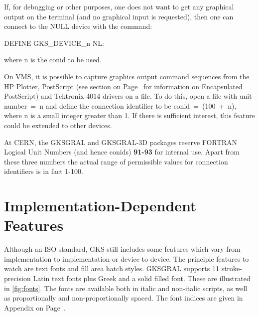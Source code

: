 If, for debugging or other purposes, one does not want to get any graphical
output on the terminal (and no graphical input is requested),
then one can connect to the NULL device with the command:
\begin{XMP}
DEFINE   GKS_DEVICE_n   NL:
\end{XMP}
where n is the conid to be used.
 
On VMS, it is possible to capture graphics output command sequences from the
HP Plotter, PostScript (see section on Page~\pageref{sec:epsref} for information
on Encapsulated PostScript) and Tektronix 4014 drivers on a file.
To do this, open a file with unit number~=~n and define the
connection identifier to be conid~=~(100~+~n),
where n is a small integer greater than 1.
If there is sufficient interest,
this feature could be extended to other devices.
\begin{note}
At CERN, the GKSGRAL and GKSGRAL-3D packages reserve FORTRAN
Logical Unit Numbers (and hence conids) {\bf 91-93} for internal use.
Apart from these three numbers the actual range of permissible values
for connection identifiers is in fact 1-100.
\end{note}
\section{\protect\label{sec:impref1}Implementation-Dependent Features}
 
Although an ISO standard, GKS still includes some features which vary from
implementation to implementation or device to device.
The principle features to watch are text fonts and fill area hatch styles.
GKSGRAL supports 11 stroke-precision Latin text fonts plus Greek
and a solid filled font.
These are illustrated in \ref{fig:fonts}. The fonts are available
both in italic and non-italic scripts, as well as proportionally and
non-proportionally spaced.
The font indices are given in Appendix on Page~\pageref{sec:wdtref}.
 
